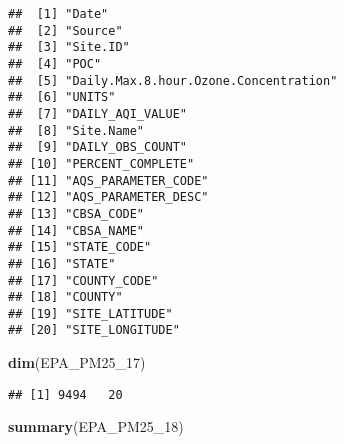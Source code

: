 \documentclass[]{article}
\newenvironment{Shaded}{\begin{snugshade}}{\end{snugshade}}
\newcommand{\KeywordTok}[1]{\textcolor[rgb]{0.13,0.29,0.53}{\textbf{#1}}}
\newcommand{\DecValTok}[1]{\textcolor[rgb]{0.00,0.00,0.81}{#1}}
\newcommand{\NormalTok}[1]{#1}
\begin{document}
\begin{verbatim}
##  [1] "Date"                                
##  [2] "Source"                              
##  [3] "Site.ID"                             
##  [4] "POC"                                 
##  [5] "Daily.Max.8.hour.Ozone.Concentration"
##  [6] "UNITS"                               
##  [7] "DAILY_AQI_VALUE"                     
##  [8] "Site.Name"                           
##  [9] "DAILY_OBS_COUNT"                     
## [10] "PERCENT_COMPLETE"                    
## [11] "AQS_PARAMETER_CODE"                  
## [12] "AQS_PARAMETER_DESC"                  
## [13] "CBSA_CODE"                           
## [14] "CBSA_NAME"                           
## [15] "STATE_CODE"                          
## [16] "STATE"                               
## [17] "COUNTY_CODE"                         
## [18] "COUNTY"                              
## [19] "SITE_LATITUDE"                       
## [20] "SITE_LONGITUDE"
\end{verbatim}

\begin{Shaded}
\begin{Highlighting}[]
\KeywordTok{dim}\NormalTok{(EPA_PM25_}\DecValTok{17}\NormalTok{)}
\end{Highlighting}
\end{Shaded}

\begin{verbatim}
## [1] 9494   20
\end{verbatim}

\begin{Shaded}
\begin{Highlighting}[]
\KeywordTok{summary}\NormalTok{(EPA_PM25_}\DecValTok{18}\NormalTok{)}
\end{Highlighting}
\end{Shaded}
\end{document}
